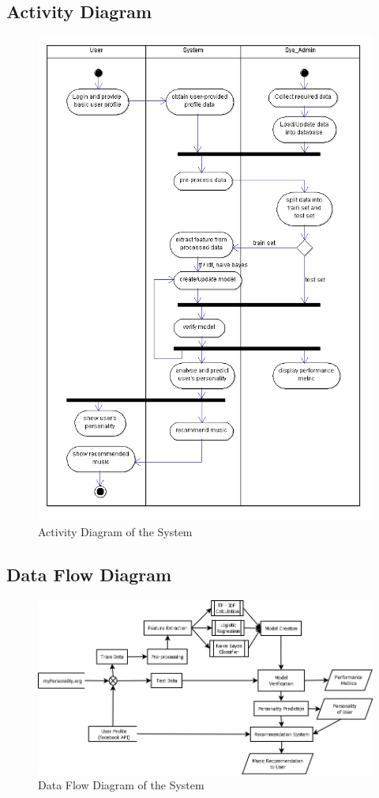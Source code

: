 \subsection{Activity Diagram}
\begin{figure}[!ht]
\centering
\includegraphics[width = 12 cm]{fig/Activity.png}
\caption{Activity Diagram of the System}
\label{fig:activity}
\end{figure}

\newpage
\subsection{Data Flow Diagram}
\begin{figure}[!ht]
\centering
\includegraphics[width = 16 cm]{fig/System.png}
\caption{Data Flow Diagram of the System}
\label{fig:dfd}
\end{figure}
